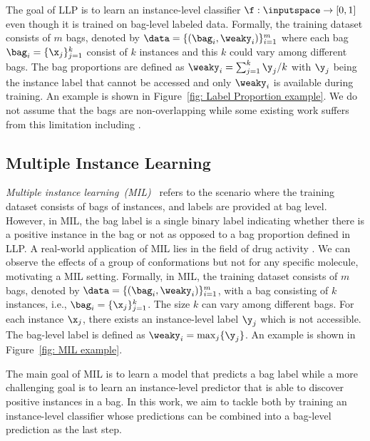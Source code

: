 \documentclass{article}
\begin{document}
The goal of LLP is to learn an instance-level classifier $\f: \inputspace \rightarrow [0, 1]$ even though it is trained on bag-level labeled data.
Formally, the training dataset consists of $m$ bags, denoted by 
$\data = \{(\bag_i, \weaky_i)\}_{i = 1}^m$ where each bag $\bag_i = \{{\x}_j\}_{j = 1}^k$ consist of $k$ instances and this $k$ could vary among different bags.
The bag proportions are defined as $\weaky_i = \sum_{j = 1}^k \y_j / k$ with $\y_j$ being the instance label that cannot be accessed and only $\weaky_i$ is available during training.
An example is shown in Figure~\ref{fig: Label Proportion example}.
We do not assume that the bags are non-overlapping 
while some existing work suffers from this limitation including \citet{NEURIPS2020_fcde1491}.
\subsection{Multiple Instance Learning}
\label{sec: MIL intro}
\emph{Multiple instance learning~(MIL)}~\citep{MIL1997framework, dietterich1997musk} refers to the scenario where the training dataset consists of bags of instances, and 
labels are provided at bag level.
However, in MIL, the bag label is a single binary label indicating whether there is a positive instance in the bag or not as opposed to a bag proportion defined in LLP.
A real-world application of MIL lies
in the field of drug activity \cite{dietterich1997musk}. 
We can observe the effects of a group of conformations but not for any specific molecule, motivating a MIL setting.
Formally, in MIL, the training dataset consists of $m$ bags, denoted by $\data = \{ (\bag_i, \weaky_i)\}_{i = 1}^m$, with a bag consisting of $k$ instances, i.e., $\bag_i = \{\x_j\}_{j = 1}^k$. The size $k$ can vary among different bags.
For each instance $\x_j$, there exists an instance-level label $\y_j$ which is not accessible. The bag-level label is defined as $\weaky_i = \max_{j}\{\y_j\}$.
An example is shown in Figure~\ref{fig: MIL example}.

The main goal of MIL is to learn a model that predicts a bag label
while a more challenging goal is to learn an instance-level predictor that is able to discover positive instances in a bag.
In this work, 
we aim to tackle both by training an instance-level classifier whose predictions can be combined into a bag-level prediction as the last step.
\end{document}
